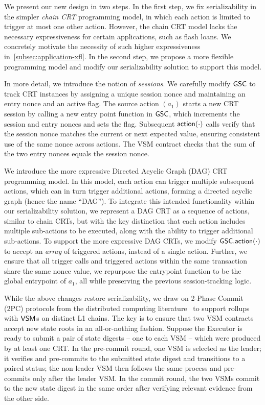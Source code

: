 We present our new design in two steps. 
In the first step, we fix serializability in the simpler \emph{chain CRT} programming model, in which each action is limited to trigger at most one other action. However, the chain CRT model lacks the necessary expressiveness for certain applications, such as flash loans. We concretely motivate the necessity of such higher expressiveness in~\cref{subsec:application-xfl}. In the second step, we propose a more flexible programming model and modify our serializability solution to support this model.

In more detail, 
we introduce the notion of {\em sessions}. We carefully modify $\mathsf{GSC}$ to track CRT instances by assigning a unique session nonce and maintaining an entry nonce and an active flag.  The source action $(a_1)$ starts a new CRT session by calling a new entry point function in $\mathsf{GSC}$, which increments the session and entry nonces and sets the flag. Subsequent $\mathsf{action}(\cdot)$ calls verify that the session nonce matches the current or next expected value, ensuring consistent use of the same nonce across actions. The VSM contract checks that the sum of the two entry nonces equals the session nonce. 




We introduce the more expressive Directed Acyclic Graph (DAG) CRT programming model. In this model, each action can trigger multiple subsequent actions, which can in turn trigger additional actions, forming a directed acyclic graph (hence the name ``DAG'').  To integrate this intended functionality within our serializability solution, we represent a DAG CRT as a sequence of actions, similar to chain CRTs, but with the key distinction that each action includes multiple sub-actions to be executed, along with the ability to trigger additional sub-actions.
To support the more expressive DAG CRTs, we modify  $\mathsf{GSC}.\mathsf{action}(\cdot)$ to accept an \emph{array} of triggered actions, instead of a single action. Further, we ensure that all trigger calls and triggered actions within the same transaction share the same nonce value, we repurpose the entrypoint function to be the global entrypoint of $a_1$, all while preserving the previous session-tracking logic.


While the above changes restore serializability, we draw on 2-Phase Commit (2PC) protocols from the distributed computing literature~\cite{bernstein-concurrency-databases-1986} to support rollups with $\mathsf{VSM}_{}$s on distinct L1 chains.
The key is to ensure that two VSM contracts accept new state roots in an all-or-nothing fashion. Suppose the Executor is ready to submit a pair of state digests -- one to each VSM -- which were produced by at least one CRT. \done%
In the pre-commit round, one VSM is selected as the leader; it verifies and pre-commits to the submitted state digest and transitions to a paired status; the non-leader VSM then follows the same process and pre-commits only after the leader VSM. In the commit round, the two VSMs commit to the new state digest in the same order after verifying relevant evidence from the other side.

